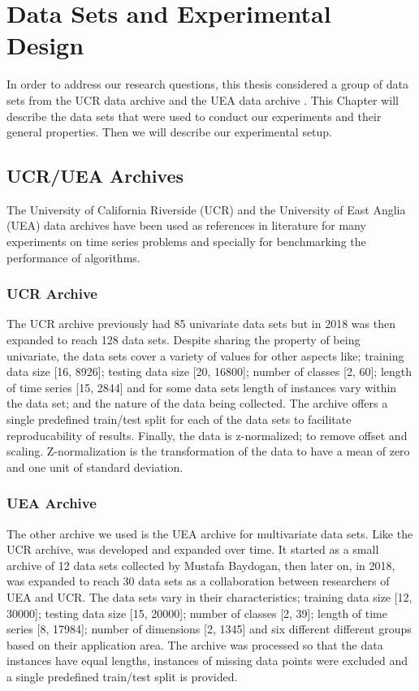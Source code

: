 \chapter{Data Sets and Experimental Design}
\label{Chapter data sets}
In order to address our research questions, this thesis considered a group of data sets from the UCR data archive \cite{UCRArchive2018} and the UEA data archive \cite{bagnall2018uea}.
This Chapter will describe the data sets that were used to conduct our experiments and their general properties.
Then we will describe our experimental setup.

\section{UCR/UEA Archives}
\label{DataArchives}
The University of California Riverside (UCR) and the University of East Anglia (UEA) data archives have been used as references in literature for many experiments on time series problems \cite{abanda2019review,fawaz2020inceptiontime,bagnall2017great,yazdanbakhsh2019multivariate,ruiz2020great,fawaz2019deepreview}
and specially for benchmarking the performance of algorithms.

\subsection{UCR Archive}
\label{UCR}
The UCR archive previously had 85 univariate data sets but in 2018 was then expanded to reach 128 data sets.
Despite sharing the property of being univariate, the data sets cover a variety of values for other aspects like;
training data size [16, 8926]; testing data size [20, 16800]; number of classes [2, 60]; length of time series [15, 2844] and for some data sets length of instances vary within the data set;
and the nature of the data being collected. The archive offers a single predefined train/test split for each of the data sets to facilitate reproducability of results.
Finally, the data is z-normalized; to remove offset and scaling. Z-normalization is the transformation of the data to have a mean of zero and one unit of standard deviation.

\subsection{UEA Archive}
\label{UEA}
The other archive we used is the UEA archive for multivariate data sets. Like the UCR archive, was developed and expanded over time.
It started as a small archive of 12 data sets collected by Mustafa Baydogan,
then later on, in 2018, was expanded to reach 30 data sets as a collaboration between researchers of UEA and UCR. The data sets vary in their characteristics;
training data size [12, 30000]; testing data size [15, 20000]; number of classes [2, 39]; length of time series [8, 17984]; number of dimensions [2, 1345] and six different different groups based on their application area.
The archive was processed so that the data instances have equal lengths, instances of missing data points were excluded and a single predefined train/test split is provided.

